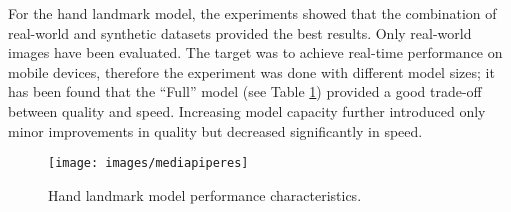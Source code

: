\noindent For the hand landmark model, the experiments showed that the combination of real-world and synthetic datasets provided the best results. Only real-world images have been evaluated. The target was to achieve real-time performance on mobile devices, therefore the experiment was done with different model sizes; it has been found that the “Full” model (see Table \ref{fig:mediapiperes}) provided a good trade-off between quality and speed. Increasing model capacity further introduced only minor improvements in quality but decreased significantly in speed.

\begin{figure}[H]
	\centering
	\texttt{[image: images/mediapiperes]}
	\caption[Hand landmark model performance characteristics.]{Hand landmark model performance characteristics.}
	\label{fig:mediapiperes}
\end{figure}

\bigskip

\iffalse

Siccome non è mai esistito un sistema che riconosce la mano davvero efficiente e in tmepo reale allora non è mai esistito la possibilità di poter controllare le traiettorie con la mano. In seguito alla soluzione recente fatta dai ricercatori di google che ha risolto i diversi problemi di performance e precisione nel riconoscere la mano, ora è possibile ragionare su come eseguire delle traiettorie con la mano. QUesto mio studio ha l'obiettivo quindi di aggiungere un'ulteriore mattoncino al lavoro svolto dai ragazzi di google per controllare il drone usando soltanto la mano, risolvendo quindi diversi problemi.

\fi